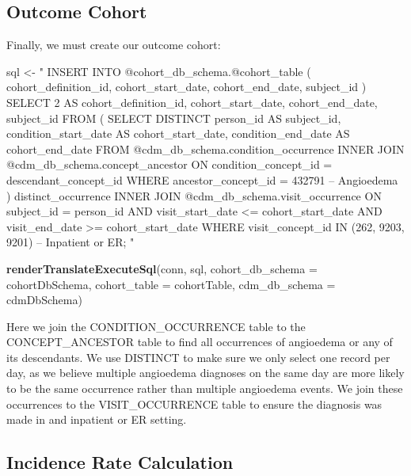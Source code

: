 \documentclass[11pt]{book}
\newenvironment{Shaded}{\begin{snugshade}}{\end{snugshade}}
\newcommand{\KeywordTok}[1]{\textcolor[rgb]{0.13,0.29,0.53}{\textbf{#1}}}
\newcommand{\DataTypeTok}[1]{\textcolor[rgb]{0.13,0.29,0.53}{#1}}
\newcommand{\StringTok}[1]{\textcolor[rgb]{0.31,0.60,0.02}{#1}}
\newcommand{\NormalTok}[1]{#1}
\theoremstyle{definition}
\theoremstyle{definition}
\theoremstyle{definition}
\theoremstyle{remark}
\begin{document}
\subsection{Outcome Cohort}\label{outcome-cohort}

Finally, we must create our outcome cohort:

\begin{Shaded}
\begin{Highlighting}[]
\NormalTok{sql <-}\StringTok{ "}
\StringTok{INSERT INTO @cohort_db_schema.@cohort_table (}
\StringTok{ cohort_definition_id,}
\StringTok{ cohort_start_date,}
\StringTok{ cohort_end_date,}
\StringTok{subject_id}
\StringTok{)}
\StringTok{SELECT 2 AS cohort_definition_id,}
\StringTok{  cohort_start_date,}
\StringTok{  cohort_end_date,}
\StringTok{  subject_id}
\StringTok{FROM (}
\StringTok{  SELECT DISTINCT person_id AS subject_id,}
\StringTok{    condition_start_date AS cohort_start_date,}
\StringTok{    condition_end_date AS cohort_end_date}
\StringTok{  FROM @cdm_db_schema.condition_occurrence}
\StringTok{  INNER JOIN @cdm_db_schema.concept_ancestor}
\StringTok{    ON condition_concept_id = descendant_concept_id}
\StringTok{  WHERE ancestor_concept_id = 432791 -- Angioedema}
\StringTok{) distinct_occurrence}
\StringTok{INNER JOIN @cdm_db_schema.visit_occurrence}
\StringTok{  ON subject_id = person_id}
\StringTok{  AND visit_start_date <= cohort_start_date}
\StringTok{  AND visit_end_date >= cohort_start_date}
\StringTok{WHERE visit_concept_id IN (262, 9203,}
\StringTok{    9201) -- Inpatient or ER;}
\StringTok{"}

\KeywordTok{renderTranslateExecuteSql}\NormalTok{(conn, sql,}
                          \DataTypeTok{cohort_db_schema =}\NormalTok{ cohortDbSchema,}
                          \DataTypeTok{cohort_table =}\NormalTok{ cohortTable,}
                          \DataTypeTok{cdm_db_schema =}\NormalTok{ cdmDbSchema)}
\end{Highlighting}
\end{Shaded}

Here we join the CONDITION\_OCCURRENCE table to the CONCEPT\_ANCESTOR
table to find all occurrences of angioedema or any of its descendants.
We use DISTINCT to make sure we only select one record per day, as we
believe multiple angioedema diagnoses on the same day are more likely to
be the same occurrence rather than multiple angioedema events. We join
these occurrences to the VISIT\_OCCURRENCE table to ensure the diagnosis
was made in and inpatient or ER setting.

\subsection{Incidence Rate
Calculation}\label{incidence-rate-calculation}
\end{document}
